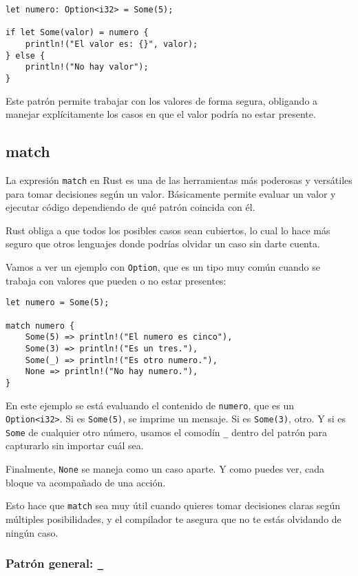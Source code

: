 \documentclass[12pt]{article}
\begin{document}
\begin{lstlisting}[style=ruststyle]
let numero: Option<i32> = Some(5);
	
if let Some(valor) = numero {
	println!("El valor es: {}", valor);
} else {
	println!("No hay valor");
}
\end{lstlisting}

Este patrón permite trabajar con los valores de forma segura, obligando a manejar explícitamente los casos en que el valor podría no estar presente.


\subsection{match}

La expresión \texttt{match} en Rust es una de las herramientas más poderosas y versátiles para tomar decisiones según un valor. Básicamente permite evaluar un valor y ejecutar código dependiendo de qué patrón coincida con él.

Rust obliga a que todos los posibles casos sean cubiertos, lo cual lo hace más seguro que otros lenguajes donde podrías olvidar un caso sin darte cuenta.

Vamos a ver un ejemplo con \texttt{Option}, que es un tipo muy común cuando se trabaja con valores que pueden o no estar presentes:

\begin{lstlisting}[style=ruststyle]
let numero = Some(5);
	
match numero {
	Some(5) => println!("El numero es cinco"),
	Some(3) => println!("Es un tres."),
	Some(_) => println!("Es otro numero."),
	None => println!("No hay numero."),
}
\end{lstlisting}

En este ejemplo se está evaluando el contenido de \texttt{numero}, que es un \texttt{Option<i32>}. Si es \texttt{Some(5)}, se imprime un mensaje. Si es \texttt{Some(3)}, otro. Y si es \texttt{Some} de cualquier otro número, usamos el comodín \texttt{\_} dentro del patrón para capturarlo sin importar cuál sea.

Finalmente, \texttt{None} se maneja como un caso aparte. Y como puedes ver, cada bloque va acompañado de una acción.

Esto hace que \texttt{match} sea muy útil cuando quieres tomar decisiones claras según múltiples posibilidades, y el compilador te asegura que no te estás olvidando de ningún caso.

\subsubsection{Patrón general: \texttt{\_}}
\end{document}
